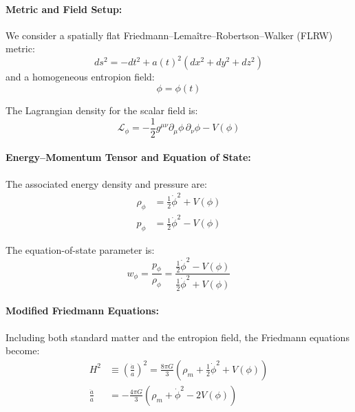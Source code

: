 \documentclass[12pt]{article}
\begin{document}
\vspace{1em}
\noindent
\paragraph{Metric and Field Setup:}

We consider a spatially flat Friedmann–Lemaître–Robertson–Walker (FLRW) metric:
\begin{equation}
ds^2 = -dt^2 + a(t)^2 \left( dx^2 + dy^2 + dz^2 \right)
\end{equation}
and a homogeneous entropion field:
\begin{equation}
\phi = \phi(t)
\end{equation}

The Lagrangian density for the scalar field is:
\begin{equation}
\mathcal{L}_\phi = -\frac{1}{2} g^{\mu\nu} \partial_\mu \phi\, \partial_\nu \phi - V(\phi)
\end{equation}

\vspace{1em}
\noindent
\paragraph{Energy–Momentum Tensor and Equation of State:}

The associated energy density and pressure are:
\begin{align}
\rho_\phi &= \frac{1}{2} \dot{\phi}^2 + V(\phi) \label{eq:A8_rho} \\
p_\phi &= \frac{1}{2} \dot{\phi}^2 - V(\phi) \label{eq:A8_p}
\end{align}

The equation-of-state parameter is:
\begin{equation}
w_\phi = \frac{p_\phi}{\rho_\phi} = \frac{\frac{1}{2} \dot{\phi}^2 - V(\phi)}{\frac{1}{2} \dot{\phi}^2 + V(\phi)} \label{eq:A8_w}
\end{equation}

\vspace{1em}
\noindent
\paragraph{Modified Friedmann Equations:}

Including both standard matter and the entropion field, the Friedmann equations become:
\begin{align}
H^2 &\equiv \left( \frac{\dot{a}}{a} \right)^2 = \frac{8\pi G}{3} \left( \rho_m + \frac{1}{2} \dot{\phi}^2 + V(\phi) \right)
\tag{A8.1}
\label{eq:A8.1} \\
\frac{\ddot{a}}{a} &= -\frac{4\pi G}{3} \left( \rho_m + \dot{\phi}^2 - 2V(\phi) \right)
\tag{A8.2}
\label{eq:A8.2}
\end{align}
\end{document}
